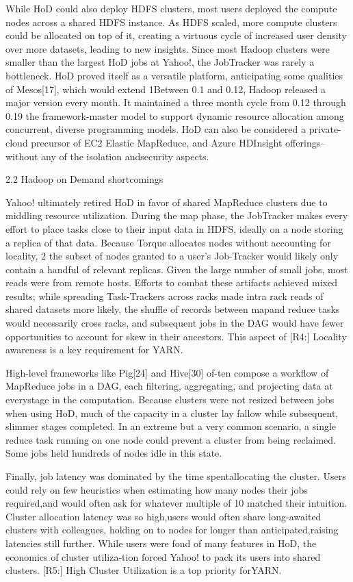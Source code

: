 While HoD could also deploy HDFS clusters, most users deployed the compute nodes
across a shared HDFS instance. 
As HDFS scaled, more compute clusters could be allocated on top of it, creating
a virtuous cycle of increased user density over more datasets, leading to new
insights. 
Since most Hadoop clusters were smaller than the largest HoD jobs at Yahoo!,
the JobTracker was rarely a bottleneck.
HoD proved itself as a versatile platform, anticipating some qualities of
Mesos[17], which would extend 1Between 0.1 and 0.12, Hadoop released a major
version every month.
It maintained a three month cycle from 0.12 through 0.19 the framework-master
model to support dynamic resource allocation among concurrent, diverse
programming models. 
HoD can also be considered a private-cloud precursor of EC2 Elastic MapReduce,
and Azure HDInsight offerings--without any of the isolation andsecurity aspects.

2.2 Hadoop on Demand shortcomings

Yahoo! ultimately retired HoD in favor of shared MapReduce clusters due to
middling resource utilization.
During the map phase, the JobTracker makes every effort to place tasks close
to their input data in HDFS, ideally on a node storing a replica of that
data.
Because Torque allocates nodes without accounting for locality, 2 the subset of
nodes granted to a user's Job-Tracker would likely only contain a handful of
relevant replicas.
Given the large number of small jobs, most reads were from remote hosts. 
Efforts to combat these artifacts achieved mixed results; while spreading
Task-Trackers across racks made intra rack reads of shared datasets more
likely, the shuffle of records between mapand reduce tasks would necessarily
cross racks, and subsequent jobs in the DAG would have fewer opportunities to
account for skew in their ancestors.
This aspect of [R4:] Locality awareness is a key requirement for YARN.

High-level frameworks like Pig[24] and Hive[30] of-ten compose a workflow of
MapReduce jobs in a DAG, each filtering, aggregating, and projecting data at
everystage in the computation.
Because clusters were not resized between jobs when using HoD, much of the
capacity in a cluster lay fallow while subsequent, slimmer stages completed.
In an extreme but a very common scenario, a single reduce task running on one
node could prevent a cluster from being reclaimed.
Some jobs held hundreds of nodes idle in this state.

Finally, job latency was dominated by the time spentallocating the cluster.
Users could rely on few heuristics when estimating how many nodes their jobs
required,and would often ask for whatever multiple of 10 matched their
intuition. 
Cluster allocation latency was so high,users would often share long-awaited
clusters with colleagues, holding on to nodes for longer than
anticipated,raising latencies still further. While users were fond of many
features in HoD, the economics of cluster utiliza-tion forced Yahoo! to pack
its users into shared clusters.
[R5:] High Cluster Utilization is a top priority forYARN.

